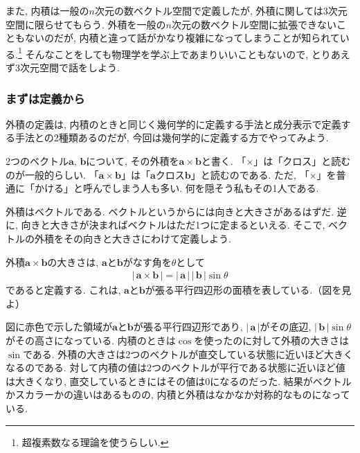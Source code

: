 また, 内積は一般の$n$次元の数ベクトル空間で定義したが, 外積に関しては3次元空間に限らせてもらう. 
外積を一般の$n$次元の数ベクトル空間に拡張できないこともないのだが, 
内積と違って話がかなり複雑になってしまうことが知られている.\footnote{超複素数なる理論を使うらしい.}
そんなことをしても物理学を学ぶ上であまりいいこともないので, とりあえず3次元空間で話をしよう. 
\subsubsection{まずは定義から}
外積の定義は, 内積のときと同じく幾何学的に定義する手法と成分表示で定義する手法との2種類あるのだが, 
今回は幾何学的に定義する方でやってみよう. 

2つのベクトル$\bm{a}$, $\bm{b}$について, その外積を$\bm{a} \times \bm{b}$と書く. 
「$\times$」は「クロス」と読むのが一般的らしい. 「$\bm{a} \times \bm{b}$」は「$\bm{a}$クロス$\bm{b}$」と読むのである. 
ただ, 「$\times$」を普通に「かける」と呼んでしまう人も多い. 
何を隠そう私もその1人である. 

外積はベクトルである. ベクトルというからには向きと大きさがあるはずだ. 
逆に, 向きと大きさが決まればベクトルはただ1つに定まるといえる. 
そこで, ベクトルの外積をその向きと大きさにわけて定義しよう. 

外積$\bm{a} \times \bm{b}$の大きさは, $\bm{a}$と$\bm{b}$がなす角を$\theta$として
\begin{eqnarray}
| \, \bm{a} \times \bm{b} \, | = | \, \bm{a} \, | \, | \, \bm{b} \, | \sin \theta 
\label{eq:gaisekiookisa}
\end{eqnarray}
であると定義する. これは, $\bm{a}$と$\bm{b}$が張る平行四辺形の面積を表している.（図を見よ）
\begin{center}
\end{center}

図に赤色で示した領域が$\bm{a}$と$\bm{b}$が張る平行四辺形であり, 
$| \, \bm{a} \, |$がその底辺, $| \, \bm{b} \, | \sin \theta$がその高さになっている. 
内積のときは$\cos$を使ったのに対して外積の大きさは$\sin$である. 
外積の大きさは2つのベクトルが直交している状態に近いほど大きくなるのである. 
対して内積の値は2つのベクトルが平行である状態に近いほど値は大きくなり, 直交しているときにはその値は0になるのだった. 
結果がベクトルかスカラーかの違いはあるものの, 内積と外積はなかなか対称的なものになっている. 

